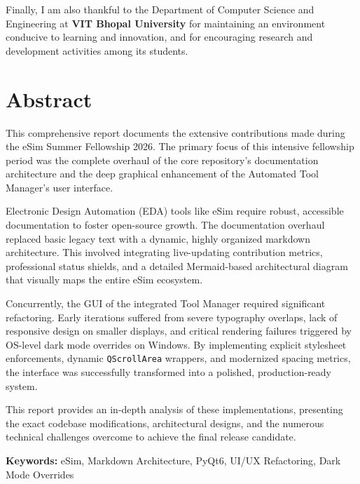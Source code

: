 \documentclass[12pt,a4paper]{report}
\begin{document}
Finally, I am also thankful to the Department of Computer Science and Engineering at \textbf{VIT Bhopal University} for maintaining an environment conducive to learning and innovation, and for encouraging research and development activities among its students.



\chapter*{Abstract}
This comprehensive report documents the extensive contributions made during the eSim Summer Fellowship 2026. The primary focus of this intensive fellowship period was the complete overhaul of the core repository's documentation architecture and the deep graphical enhancement of the Automated Tool Manager's user interface.

Electronic Design Automation (EDA) tools like eSim require robust, accessible documentation to foster open-source growth. The documentation overhaul replaced basic legacy text with a dynamic, highly organized markdown architecture. This involved integrating live-updating contribution metrics, professional status shields, and a detailed Mermaid-based architectural diagram that visually maps the entire eSim ecosystem.

Concurrently, the GUI of the integrated Tool Manager required significant refactoring. Early iterations suffered from severe typography overlaps, lack of responsive design on smaller displays, and critical rendering failures triggered by OS-level dark mode overrides on Windows. By implementing explicit stylesheet enforcements, dynamic \texttt{QScrollArea} wrappers, and modernized spacing metrics, the interface was successfully transformed into a polished, production-ready system.

This report provides an in-depth analysis of these implementations, presenting the exact codebase modifications, architectural designs, and the numerous technical challenges overcome to achieve the final release candidate.

\vskip 1cm
\textbf{Keywords:} eSim, Markdown Architecture, PyQt6, UI/UX Refactoring, Dark Mode Overrides

\newpage
\begin{singlespace}
\tableofcontents
\end{singlespace}
\newpage
\listoffigures
{}
\setcounter{page}{1}
\end{document}
